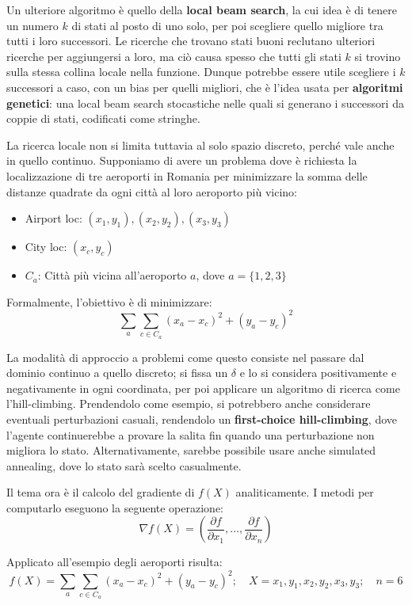 \noindent Un ulteriore algoritmo è quello della \textbf{local beam search}, la cui idea è di tenere un numero $k$ di stati al posto di uno solo, per poi
scegliere quello migliore tra tutti i loro successori. Le ricerche che trovano stati buoni reclutano ulteriori ricerche per aggiungersi a loro, ma ciò
causa spesso che tutti gli stati $k$ si trovino sulla stessa collina locale nella funzione. Dunque potrebbe essere utile scegliere i $k$ successori a
caso, con un bias per quelli migliori, che è l'idea usata per \textbf{algoritmi genetici}: una local beam search stocastiche nelle quali si generano i
successori da coppie di stati, codificati come stringhe.\par
La ricerca locale non si limita tuttavia al solo spazio discreto, perché vale anche in quello continuo. Supponiamo di avere un problema dove è richiesta
la localizzazione di tre aeroporti in Romania per minimizzare la somma delle distanze quadrate da ogni città al loro aeroporto più vicino:
\begin{itemize}
    \item Airport loc: $(x_1, y_1), (x_2, y_2), (x_3, y_3)$
    \item City loc: $(x_c, y_c)$
    \item $C_a$: Città più vicina all'aeroporto $a$, dove $a = \{1,2,3\}$
\end{itemize}

\noindent Formalmente, l'obiettivo è di minimizzare: \[
	\sum_a \sum_{c\in C_a}(x_a - x_c)^2 + (y_a - y_c)^2
\]

\noindent La modalità di approccio a problemi come questo consiste nel passare dal dominio continuo a quello discreto; si fissa un $\delta$ e lo si
considera positivamente e negativamente in ogni coordinata, per poi applicare un algoritmo di ricerca come l'hill-climbing. Prendendolo come esempio, si
potrebbero anche considerare eventuali perturbazioni casuali, rendendolo un \textbf{first-choice hill-climbing}, dove l'agente continuerebbe a provare
la salita fin quando una perturbazione non migliora lo stato. Alternativamente, sarebbe possibile usare anche simulated annealing, dove lo stato sarà
scelto casualmente.\par
Il tema ora è il calcolo del gradiente di $f(X)$ analiticamente. I metodi per computarlo eseguono la seguente operazione: \[
	\nabla f(X) = \left(\frac{\partial f}{\partial x_1}, ..., \frac{\partial f}{\partial x_n} \right)
\]

\noindent Applicato all'esempio degli aeroporti risulta: \[
	f(X) = \sum_a\sum_{c\in C_a}(x_a - x_c)^2 + (y_a-y_c)^2;\quad X = {x_1, y_1, x_2, y_2, x_3, y_3};\quad n = 6
\]


